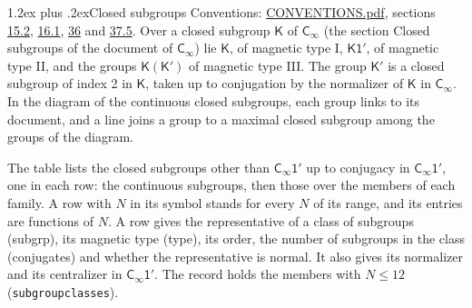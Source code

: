 \documentclass[10pt,a4paper]{article}
\makeatletter
\renewcommand\section{\@startsection{section}{1}{\z@}{-3ex plus -1ex minus -.2ex}%
  {1.2ex plus .2ex}{\normalfont\large\sffamily\bfseries\color{parttitle}}}
\numberwithin{equation}{section}
\newcommand{\grp}[1]{\mathsf{#1}}
\makeatother
\begin{document}
\section{Closed subgroups}\label{s:subgroups}
Conventions: \href{../../CONVENTIONS.pdf}{CONVENTIONS.pdf}, sections \href{../../../rotation/CONVENTIONS.pdf\#conv.15.2}{15.2}, \href{../../../rotation/CONVENTIONS.pdf\#conv.16.1}{16.1}, \href{../../CONVENTIONS.pdf\#conv.36}{36} and \href{../../CONVENTIONS.pdf\#conv.37.5}{37.5}.
\leavevmode\label{n:group.subgroup.point}Over a closed subgroup $\grp{K}$ of $\grp{C_{\infty}}$ (the section Closed subgroups of the document of \href{../../../rotation/data/pdf/Cinf.pdf}{$\grp{C_{\infty}}$}) lie $\grp{K}$, of magnetic type I, $\grp{K1'}$, of magnetic type II, and the groups $\grp{K}(\grp{K}')$ of magnetic type III. The group $\grp{K}'$ is a closed subgroup of index 2 in $\grp{K}$, taken up to conjugation by the normalizer of $\grp{K}$ in $\grp{C_{\infty}}$. In the diagram of the continuous closed subgroups, each group links to its document, and a line joins a group to a maximal closed subgroup among the groups of the diagram.
\begin{center}\end{center}
The table lists the closed subgroups other than $\grp{C_{\infty}1'}$ up to conjugacy in $\grp{C_{\infty}1'}$, one in each row: the continuous subgroups, then those over the members of each family. \label{n:index.family.N}A row with $N$ in its symbol stands for every $N$ of its range, and its entries are functions of $N$. \label{n:head.subgroup}\label{n:head.magnetic.type}\label{n:head.order}\label{n:head.conjugates}\label{n:head.normal}A row gives the representative of a class of subgroups (subgrp), its magnetic type (type), its order, the number of subgroups in the class (conjugates) and whether the representative is normal. \label{n:head.normalizer}\label{n:head.centralizer}It also gives its normalizer and its centralizer in $\grp{C_{\infty}1'}$. The record holds the members with $N \le 12$ (\texttt{subgroupclasses}).
\end{document}
